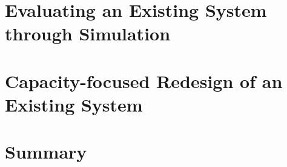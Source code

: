 
\section{Evaluating an Existing System through Simulation}

\section{Capacity-focused Redesign of an Existing System}


\section{Summary}